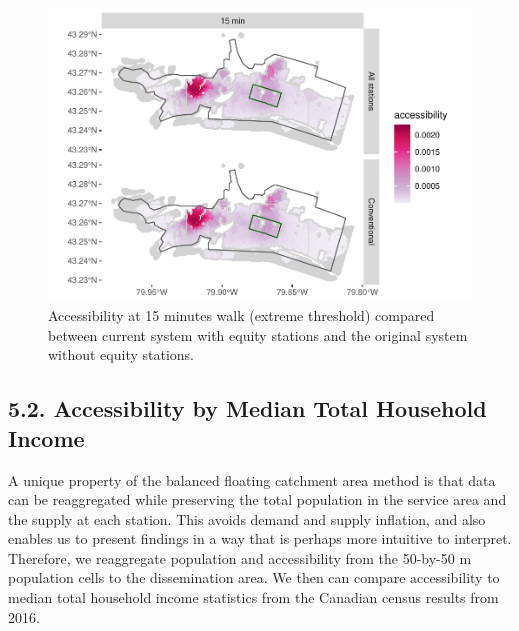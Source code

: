 \documentclass[]{elsarticle} %
\begin{document}
\begin{figure}

{\centering \includegraphics[width=0.9\linewidth]{Bike-share-spatial-equity_files/figure-latex/figure-9-1} 

}

\caption{Accessibility at 15 minutes walk (extreme threshold) compared between current system with equity stations and the original system without equity stations.}\label{fig:figure-9}
\end{figure}

\hypertarget{accessibility-by-median-total-household-income}{%
\subsection{5.2. Accessibility by Median Total Household
Income}\label{accessibility-by-median-total-household-income}}

A unique property of the balanced floating catchment area method is that
data can be reaggregated while preserving the total population in the
service area and the supply at each station. This avoids demand and
supply inflation, and also enables us to present findings in a way that
is perhaps more intuitive to interpret. Therefore, we reaggregate
population and accessibility from the 50-by-50 m population cells to the
dissemination area. We then can compare accessibility to median total
household income statistics from the Canadian census results from 2016.
\end{document}
